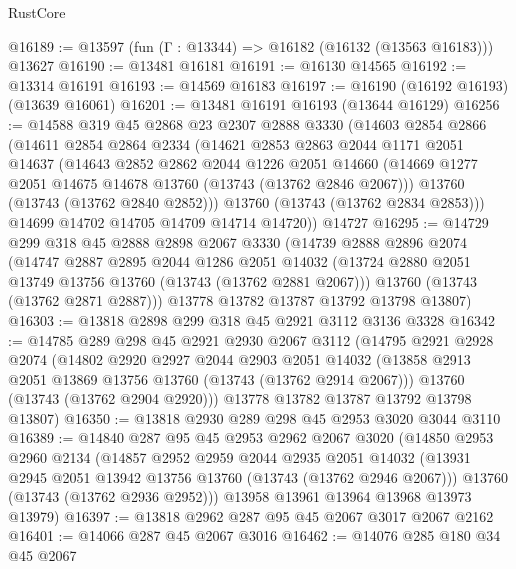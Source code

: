 \begin{lexlean}{RustCore}
\begin{coremodule}
@16189 := @13597 (fun (Γ : @13344) => @16182 (@16132 (@13563 @16183))) @13627
@16190 := @13481 @16181
@16191 := @16130 @14565
@16192 := @13314 @16191
@16193 := @14569 @16183
@16197 := @16190 (@16192 @16193) (@13639 @16061)
@16201 := @13481 @16191 @16193 (@13644 @16129)
@16256 := @14588
    @319
    @45
    @2868
    @23
    @2307
    @2888
    @3330
    (@14603
      @2854
      @2866
      (@14611
        @2854
        @2864
        @2334
        (@14621
          @2853
          @2863
          @2044
          @1171
          @2051
          @14637
          (@14643
            @2852
            @2862
            @2044
            @1226
            @2051
            @14660
            (@14669 @1277 @2051 @14675 @14678 @13760 (@13743 (@13762 @2846 @2067)))
            @13760
            (@13743 (@13762 @2840 @2852)))
          @13760
          (@13743 (@13762 @2834 @2853)))
        @14699
        @14702
        @14705
        @14709
        @14714
        @14720))
    @14727
@16295 := @14729
    @299
    @318
    @45
    @2888
    @2898
    @2067
    @3330
    (@14739
      @2888
      @2896
      @2074
      (@14747
        @2887
        @2895
        @2044
        @1286
        @2051
        @14032
        (@13724 @2880 @2051 @13749 @13756 @13760 (@13743 (@13762 @2881 @2067)))
        @13760
        (@13743 (@13762 @2871 @2887)))
      @13778
      @13782
      @13787
      @13792
      @13798
      @13807)
@16303 := @13818 @2898 @299 @318 @45 @2921 @3112 @3136 @3328
@16342 := @14785
    @289
    @298
    @45
    @2921
    @2930
    @2067
    @3112
    (@14795
      @2921
      @2928
      @2074
      (@14802
        @2920
        @2927
        @2044
        @2903
        @2051
        @14032
        (@13858 @2913 @2051 @13869 @13756 @13760 (@13743 (@13762 @2914 @2067)))
        @13760
        (@13743 (@13762 @2904 @2920)))
      @13778
      @13782
      @13787
      @13792
      @13798
      @13807)
@16350 := @13818 @2930 @289 @298 @45 @2953 @3020 @3044 @3110
@16389 := @14840
    @287
    @95
    @45
    @2953
    @2962
    @2067
    @3020
    (@14850
      @2953
      @2960
      @2134
      (@14857
        @2952
        @2959
        @2044
        @2935
        @2051
        @14032
        (@13931 @2945 @2051 @13942 @13756 @13760 (@13743 (@13762 @2946 @2067)))
        @13760
        (@13743 (@13762 @2936 @2952)))
      @13958
      @13961
      @13964
      @13968
      @13973
      @13979)
@16397 := @13818 @2962 @287 @95 @45 @2067 @3017 @2067 @2162
@16401 := @14066 @287 @45 @2067 @3016
@16462 := @14076
    @285
    @180
    @34
    @45
    @2067

\end{coremodule}
\end{lexlean}
